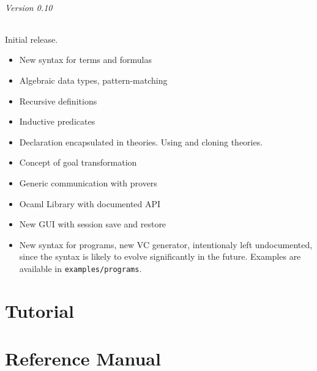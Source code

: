 \documentclass[a4paper,11pt,twoside,openright]{memoir}
\begin{document}
\paragraph{Version 0.10}
Initial release. 
\begin{itemize}
\item New syntax for terms and formulas
\item Algebraic data types, pattern-matching
\item Recursive definitions
\item Inductive predicates
\item Declaration encapsulated in theories. Using and cloning theories.
\item Concept of goal transformation
\item Generic communication with provers
\item Ocaml Library with documented API
\item New GUI with session save and restore
\item New syntax for programs, new VC generator, intentionaly left
  undocumented, since the syntax is likely to evolve significantly in
  the future. Examples are available in \texttt{examples/programs}.
\end{itemize}
\cleardoublepage

\tableofcontents




\part{Tutorial}





% 

% 



\part{Reference Manual}

% 











%

\cleardoublepage
\printindex
\end{document}

